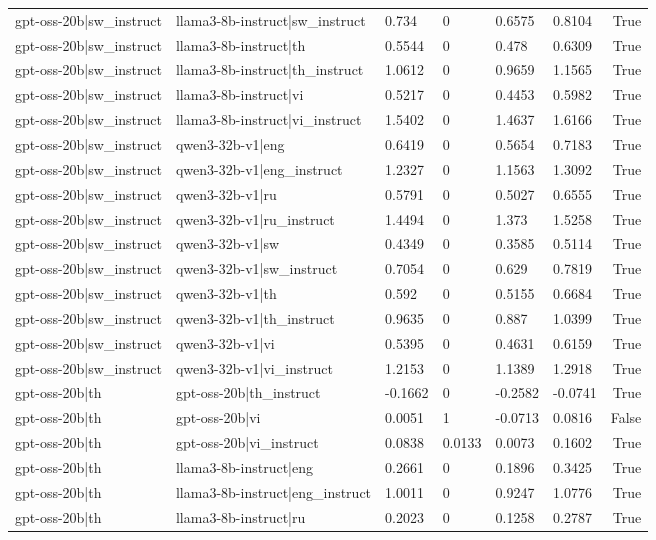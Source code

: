 \begin{table}
\begin{tabular}{llllllr}
gpt-oss-20b|sw_instruct & llama3-8b-instruct|sw_instruct & 0.734 & 0 & 0.6575 & 0.8104 & True \\
gpt-oss-20b|sw_instruct & llama3-8b-instruct|th & 0.5544 & 0 & 0.478 & 0.6309 & True \\
gpt-oss-20b|sw_instruct & llama3-8b-instruct|th_instruct & 1.0612 & 0 & 0.9659 & 1.1565 & True \\
gpt-oss-20b|sw_instruct & llama3-8b-instruct|vi & 0.5217 & 0 & 0.4453 & 0.5982 & True \\
gpt-oss-20b|sw_instruct & llama3-8b-instruct|vi_instruct & 1.5402 & 0 & 1.4637 & 1.6166 & True \\
gpt-oss-20b|sw_instruct & qwen3-32b-v1|eng & 0.6419 & 0 & 0.5654 & 0.7183 & True \\
gpt-oss-20b|sw_instruct & qwen3-32b-v1|eng_instruct & 1.2327 & 0 & 1.1563 & 1.3092 & True \\
gpt-oss-20b|sw_instruct & qwen3-32b-v1|ru & 0.5791 & 0 & 0.5027 & 0.6555 & True \\
gpt-oss-20b|sw_instruct & qwen3-32b-v1|ru_instruct & 1.4494 & 0 & 1.373 & 1.5258 & True \\
gpt-oss-20b|sw_instruct & qwen3-32b-v1|sw & 0.4349 & 0 & 0.3585 & 0.5114 & True \\
gpt-oss-20b|sw_instruct & qwen3-32b-v1|sw_instruct & 0.7054 & 0 & 0.629 & 0.7819 & True \\
gpt-oss-20b|sw_instruct & qwen3-32b-v1|th & 0.592 & 0 & 0.5155 & 0.6684 & True \\
gpt-oss-20b|sw_instruct & qwen3-32b-v1|th_instruct & 0.9635 & 0 & 0.887 & 1.0399 & True \\
gpt-oss-20b|sw_instruct & qwen3-32b-v1|vi & 0.5395 & 0 & 0.4631 & 0.6159 & True \\
gpt-oss-20b|sw_instruct & qwen3-32b-v1|vi_instruct & 1.2153 & 0 & 1.1389 & 1.2918 & True \\
gpt-oss-20b|th & gpt-oss-20b|th_instruct & -0.1662 & 0 & -0.2582 & -0.0741 & True \\
gpt-oss-20b|th & gpt-oss-20b|vi & 0.0051 & 1 & -0.0713 & 0.0816 & False \\
gpt-oss-20b|th & gpt-oss-20b|vi_instruct & 0.0838 & 0.0133 & 0.0073 & 0.1602 & True \\
gpt-oss-20b|th & llama3-8b-instruct|eng & 0.2661 & 0 & 0.1896 & 0.3425 & True \\
gpt-oss-20b|th & llama3-8b-instruct|eng_instruct & 1.0011 & 0 & 0.9247 & 1.0776 & True \\
gpt-oss-20b|th & llama3-8b-instruct|ru & 0.2023 & 0 & 0.1258 & 0.2787 & True \\

\end{tabular}
\end{table}
